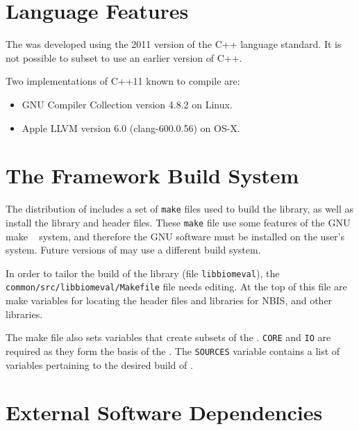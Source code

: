 %
%
\section{Language Features}

The \lname was developed using the 2011 version of the C++ language standard.
It is not possible to subset \sname to use an earlier version of C++.

Two implementations of C++11 known to compile \sname are:
\begin{itemize}
\item GNU Compiler Collection version 4.8.2 on Linux.
\item Apple LLVM version 6.0 (clang-600.0.56) on OS-X.
\end{itemize}

\section{The Framework Build System}

The distribution of \sname includes a set of \texttt{make} files used to build
the \sname library, as well as install the library and header files. These
\texttt{make} file use some features of the GNU make ~\cite{gnumake}
system, and therefore the GNU software must be installed on the user's system.
Future versions of \sname may use a different build system.

In order to tailor the build of the \sname library (file \texttt{libbiomeval}),
the \texttt{common/src/libbiomeval/Makefile} file needs editing. At the top of
this file are make variables for locating the header files and libraries for
NBIS, and other libraries.

The make file also sets variables that create subsets of the \sname.
\texttt{CORE} and \texttt{IO} are required as they form the basis of the
\sname. The \texttt{SOURCES} variable contains a list of variables pertaining
to the desired build of \sname.

\section{External Software Dependencies}

